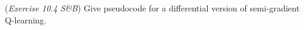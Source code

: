 (\textit{Exercise 10.4 S\&B})
Give pseudocode for a differential version of semi-gradient Q-learning.